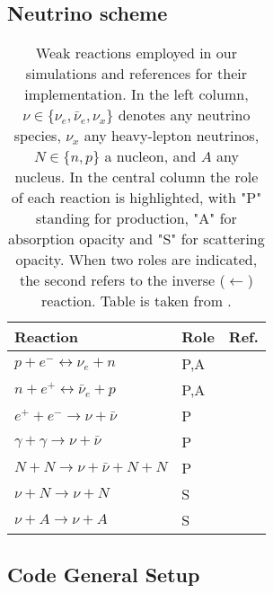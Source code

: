 \subsection{Neutrino scheme}


\begin{table}
    \caption{
        Weak reactions employed in our simulations and references for their implementation.
        In the left column, $\nu \in \{\nu_e, \bar{\nu}_e, \nu_{x}\}$ denotes any neutrino species, 
        $\nu_{x}$ any heavy-lepton neutrinos, $N \in\{n, p\}$ a nucleon, and $A$ any nucleus.
        In the central column the role of each reaction is highlighted, with "P" standing for 
        production, "A" for absorption opacity and "S" for scattering opacity. When two roles are
        indicated, the second refers to the inverse ($\leftarrow$) reaction.
        Table is taken from \cite{Radice:2018pdn}.
    }
    \label{tab:leakage}
    \begin{center}
        \begin{tabular}{lll}
            \hline\hline
            Reaction & Role &  Ref. \\ 
            \hline
            $p + e^- \leftrightarrow \nu_e + n $          & P,A & \cite{Bruenn:1985}  \\
            $n + e^+ \leftrightarrow \bar{\nu}_{e} + p $  & P,A & \cite{Bruenn:1985}  \\
            $e^+ + e^- \rightarrow \nu + \bar{\nu}$       & P & \cite{Ruffert:1995fs} \\
            $\gamma + \gamma \rightarrow \nu + \bar{\nu}$ & P & \cite{Ruffert:1995fs} \\
            $N + N \rightarrow \nu + \bar{\nu} + N  + N$  & P & \cite{Burrows:2004vq} \\
            $\nu + N \rightarrow \nu + N$                 & S & \cite{Ruffert:1995fs} \\
            $\nu + A \rightarrow \nu + A$                 & S & \cite{Shapiro:1983du} \\
            \hline\hline
        \end{tabular}
    \end{center}
\end{table}


\subsection{Code General Setup}



